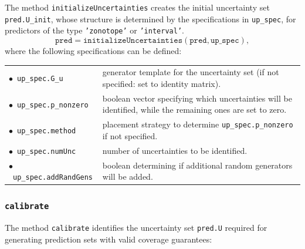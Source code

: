 The method \texttt{initializeUncertainties} creates the initial uncertainty set \texttt{pred.U\_init}, whose structure is determined by the specifications in \texttt{up\_spec}, for predictors of the type \texttt{'zonotope'} or \texttt{'interval'}.
\begin{equation*}
	\texttt{pred} = \texttt{initializeUncertainties}(\texttt{pred},\texttt{up\_spec}),
\end{equation*}
where the following specifications can be defined:
\begin{center}
\renewcommand{\arraystretch}{1.3}
\begin{tabular}[t]{l p{13cm} }
	$\bullet$~\texttt{up\_spec.G\_u} & generator template for the uncertainty set (if not specified: set to identity matrix).\\
	$\bullet$~\texttt{up\_spec.p\_nonzero} & boolean vector specifying which uncertainties will be identified, while the remaining ones are set to zero.\\
	$\bullet$~\texttt{up\_spec.method} & placement strategy to determine \texttt{up\_spec.p\_nonzero} if not specified.\\
	$\bullet$~\texttt{up\_spec.numUnc} & number of uncertainties to be identified. \\
	$\bullet$~\texttt{up\_spec.addRandGens} & boolean determining if additional random generators will be added. \\
\end{tabular}
\end{center}


\subsubsection{\texttt{calibrate}}

The method \texttt{calibrate} identifies the uncertainty set \texttt{pred.U} required for generating prediction sets with valid coverage guarantees:

